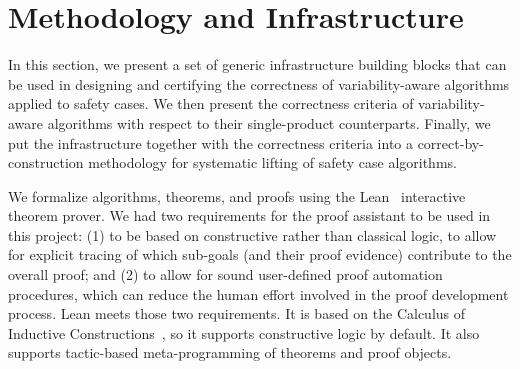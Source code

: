 \newcommand{\lift}[1] {#1$'$}
\newcommand{\liftt}[1] {#1'}
\newcommand{\find}{\texttt{Find}}
\newcommand{\ff}{\texttt{False}}
\newcommand{\instance}{P}
\newcommand{\result}{R}
\newcommand{\analysis}{f}

\newcommand{\Rn}{R'}
\newcommand{\TR}{\lift{TraceRel}}
\newcommand{\Cza}{C0a}
\newcommand{\Czd}{C0d}
\newcommand{\Czm}{C0m}
\newcommand{\Codm}{C1dm}
\newcommand{\Coam}{C1am}

\newcommand{\tPC}{\code{PC}}
\newcommand{\Var}{\code{Var}}
\newcommand{\lset}{\code{set$'$}}

\vspace{-0.15in}
\section{Methodology and Infrastructure}
\label{sec:methodology}
\vspace{-0.1in}
In this section, we present a set of generic infrastructure building blocks that can be used in designing and certifying the correctness of variability-aware algorithms applied to safety cases.
We then present the correctness criteria of variability-aware algorithms with respect to their single-product counterparts. 
Finally, we put the infrastructure together with the correctness criteria into a correct-by-construction methodology for systematic lifting of safety case algorithms.  

We formalize algorithms, theorems, and proofs using the Lean~\cite{deMoura:2015} interactive theorem prover. 
We had two requirements for the proof assistant to be used in this project: (1) to be based on constructive rather than classical logic, to allow for explicit tracing of which sub-goals (and their proof evidence) contribute to the overall proof; and (2) to allow for sound user-defined proof automation procedures, which can reduce the human effort involved in the proof development process. Lean meets those two requirements. It is based on the Calculus of Inductive Constructions~\cite{Bertot:2010}, so it supports constructive logic by default. It also supports tactic-based meta-programming of theorems and proof objects. 


